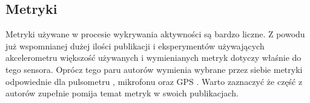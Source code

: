 \subsection{Metryki}
Metryki używane w procesie wykrywania aktywności są bardzo liczne. Z powodu już wspomnianej dużej ilości publikacji i eksperymentów używających akcelerometru większość używanych i wymienianych metryk dotyczy właśnie do tego sensora. Oprócz tego paru autorów wymienia wybrane przez siebie metryki odpowiednie dla pulsometru \cite{S04}, mikrofonu \cite{S22, S46} oraz GPS \cite{S26}. Warto zaznaczyć że część z autorów zupełnie pomija temat metryk w swoich publikacjach.


